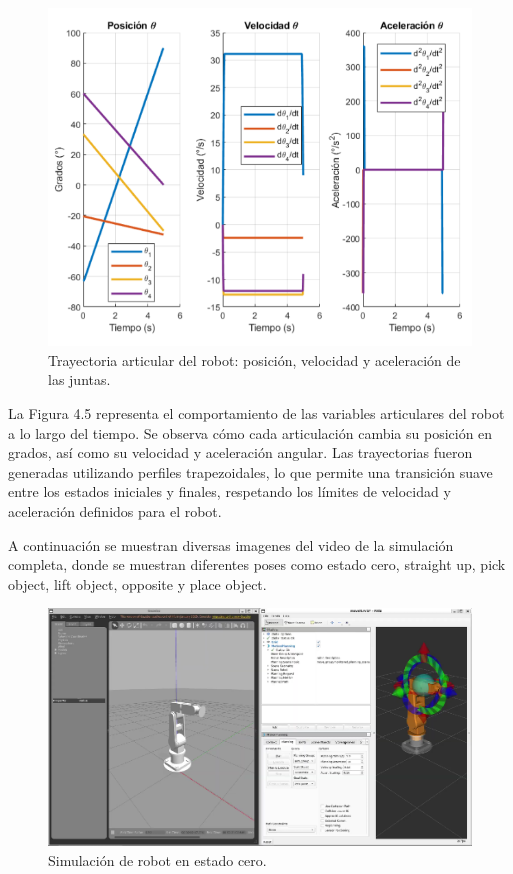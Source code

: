 \begin{figure} [H]
	\centering
	\includegraphics[width=0.9\linewidth]{img/inversa3}
	\caption{Trayectoria articular del robot: posición, velocidad y aceleración de las juntas.}
	\label{fig:inversa3}
\end{figure}
La Figura 4.5 representa el comportamiento de las variables articulares del robot a lo largo del tiempo. Se observa cómo cada articulación cambia su posición en grados, así como su velocidad y aceleración angular. Las trayectorias fueron generadas utilizando perfiles trapezoidales, lo que permite una transición suave entre los estados iniciales y finales, respetando los límites de velocidad y aceleración definidos para el robot.


\newpage

A continuación se muestran diversas imagenes del video de la simulación completa, donde se muestran diferentes poses como estado cero, straight up, pick object, lift object, opposite y place object. 


\begin{figure} [H]
	\centering
	\includegraphics[width=0.9\linewidth]{img/SIMU1}
	\caption{Simulación de robot en estado cero.}
	\label{fig:SIMU1}
\end{figure}


